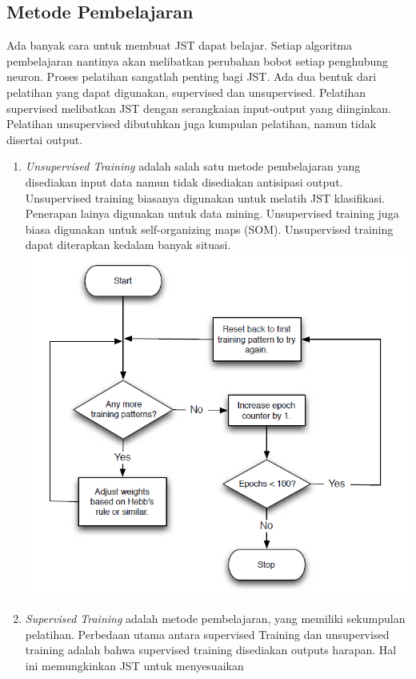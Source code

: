 \subsection{Metode Pembelajaran}
Ada banyak cara untuk membuat JST dapat belajar. Setiap algoritma pembelajaran nantinya akan melibatkan perubahan bobot setiap penghubung neuron. Proses pelatihan sangatlah penting bagi JST. Ada dua bentuk dari pelatihan yang dapat digunakan, supervised dan unsupervised. Pelatihan supervised melibatkan JST dengan serangkaian input-output yang diinginkan. Pelatihan unsupervised dibutuhkan juga kumpulan pelatihan, namun tidak disertai output.
\begin{enumerate}
	\item \textit{Unsupervised Training} adalah salah satu metode pembelajaran yang disediakan input data namun tidak disediakan antisipasi output. Unsupervised training biasanya digunakan untuk melatih JST klasifikasi. Penerapan lainya digunakan untuk data mining. Unsupervised training juga biasa digunakan untuk self-organizing maps (SOM). Unsupervised training dapat diterapkan kedalam banyak situasi.\\
	\includegraphics[width=\linewidth]{Gambar/mine/unsupervised}
	\item \textit{Supervised Training} adalah metode pembelajaran, yang memiliki sekumpulan pelatihan. Perbedaan utama antara supervised Training dan unsupervised training adalah bahwa supervised training disediakan outputs harapan. Hal ini memungkinkan JST untuk menyesuaikan

\end{enumerate}
